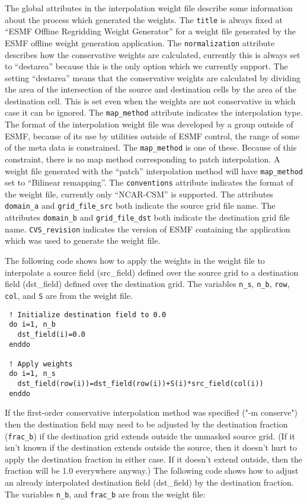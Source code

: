 The global attributes in the interpolation weight file describe some information about the process
which generated the weights. The {\tt title} is always fixed at ``ESMF Offline Regridding Weight Generator'' for
a weight file generated by the ESMF offline weight generation application. The
{\tt normalization} attribute describes how the conservative weights are calculated, currently this is always
set to ``destarea'' because this is the only option which we currently support. The setting ``destarea''
means that the conservative  weights are calculated by dividing the area of the intersection of the source
and destination cells by the area of the
destination cell. This is set even when the weights are not conservative in which case it can be ignored.
The {\tt map\_method} attribute indicates the interpolation type. The format of the interpolation weight file was developed
by a group outside of ESMF, because of its use by utilities outside of ESMF control, the range of some of the
meta data is constrained. The {\tt map\_method} is one of these. Because of this constraint, there is no
map method corresponding to patch interpolation. A weight file generated with the ``patch''
interpolation method will have {\tt map\_method} set to ``Bilinear remapping''.
 The {\tt conventions} attribute indicates the format of the weight file, currently only ``NCAR-CSM'' is
 supported. The attributes {\tt domain\_a} and {\tt grid\_file\_src} both indicate the source
grid file name.
The attributes {\tt domain\_b} and {\tt grid\_file\_dst} both indicate the destination grid file name.
{\tt CVS\_revision} indicates the version of ESMF containing the application which was used to generate the
weight file.

The following code shows how to apply the weights in the weight file to interpolate a source field (src\_field) defined 
over the source grid to a destination field (dst\_field) defined over the destination grid. The variables {\tt n\_s}, {\tt n\_b}, 
{\tt row}, {\tt col}, and {\tt S} are from the weight file. 

\begin{verbatim}
 ! Initialize destination field to 0.0
 do i=1, n_b
   dst_field(i)=0.0
 enddo

 ! Apply weights
 do i=1, n_s
   dst_field(row(i))=dst_field(row(i))+S(i)*src_field(col(i))
 enddo
\end{verbatim}


If the first-order conservative interpolation method was specified ("-m conserve") then the destination field may need to be adjusted by the destination fraction ({\tt frac\_b}) if the destination grid extends outside the unmasked source grid. (If it isn't known if the destination extends outside the source, then it doesn't hurt to apply the destination fraction in either case. If it doesn't extend outside, then the fraction will be 1.0 everywhere anyway.) The following code shows how to adjust an already interpolated destination field (dst\_field) by the destination fraction. The variables {\tt n\_b}, and {\tt frac\_b} are from the weight file:

